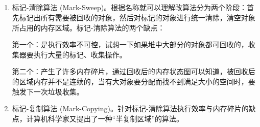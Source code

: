 \documentclass[../../../interview-questions.tex]{subfiles}
\begin{document}
\subsection{\color{red}{JVM垃圾回收算法}}

\begin{enumerate}
    \item{标记-清除算法 (Mark-Sweep)。}根据名称就可以理解改算法分为两个阶段：首先标记出所有需要被回收的对象，然后对标记的对象进行统一清除，清空对象所占用的内存区域。标记-清除算法的两个缺点：

    第一个：是执行效率不可控，试想一下如果堆中大部分的对象都可回收的，收集器要执行大量的标记、收集操作。
    
    第二个：产生了许多内存碎片，通过回收后的内存状态图可以知道，被回收后的区域内存并不是连续的，当有大对象要分配而找不到满足大小的空间时，要触发下一次垃圾收集。
    \item{标记-复制算法 (Mark-Copying)。}针对标记-清除算法执行效率与内存碎片的缺点，计算机科学家又提出了一种“半复制区域”的算法。


\end{enumerate}
\end{document}

